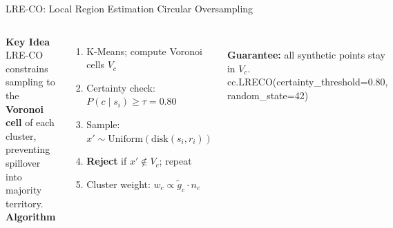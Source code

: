\documentclass[aspectratio=169,10pt]{beamer}
\begin{document}
\begin{frame}[t]{LRE-CO: Local Region Estimation Circular Oversampling}
\begin{columns}[T]
{\small\bfseries\color{myblue}Key Idea}\\[2pt]
{\footnotesize
LRE-CO constrains sampling to the \textbf{Voronoi cell} of each cluster,
preventing spillover into majority territory.
}\\[2pt]
{\small\bfseries\color{myblue}Algorithm}\\[1pt]
{\footnotesize
\begin{enumerate}\itemsep1pt
  \item K-Means; compute Voronoi cells $V_c$
  \item Certainty check: $P(c\mid s_i)\ge\tau{=}0.80$
  \item Sample: $x'\sim\mathrm{Uniform}(\mathrm{disk}(s_i,r_i))$
  \item \textbf{Reject} if $x'\notin V_c$; repeat
  \item Cluster weight: $w_c\propto\tilde{g}_c\cdot n_c$
\end{enumerate}
}\\[2pt]
{\footnotesize\color{mygreen}
  \textbf{Guarantee:} all synthetic points stay in $V_c$.}\\[3pt]
{\scriptsize\ttfamily\color{myblue}
cc.LRECO(certainty\_threshold=0.80,\\
\quad random\_state=42)
}


\end{columns}
\end{frame}
\end{document}
